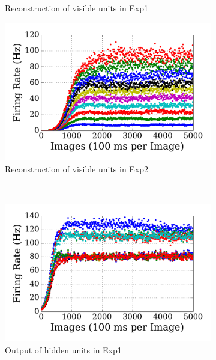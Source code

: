 \begin{figure}
\begin{subfigure}[t]{0.45\textwidth}
		\caption{Reconstruction of visible units in Exp1}
	\end{subfigure}
	\begin{subfigure}[t]{0.45\textwidth}
		\includegraphics[width=\textwidth]{pics_sdlm/00_exp_SAE_Orig/exp2_recon_s.pdf}
		\caption{Reconstruction of visible units in Exp2}
	\end{subfigure}\\
	\begin{subfigure}[t]{0.45\textwidth}
		\includegraphics[width=\textwidth]{pics_sdlm/00_exp_SAE_Orig/exp1_hid_s.pdf}
		\caption{Output of hidden units in Exp1}
	\end{subfigure}
	\begin{subfigure}[t]{0.45\textwidth}

\end{subfigure}
\end{figure}
